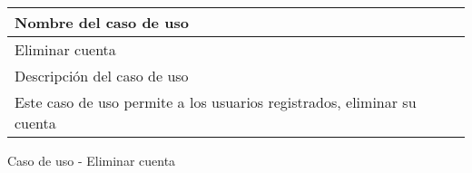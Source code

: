 \begin{identificacionCasoDeUso}
	\begin{tabular} { | p{17cm} |}

		\hline
		Nombre del caso de uso                                                  \\ \hline
		Eliminar cuenta                                                         \\ \hline
		Descripción del caso de uso                                             \\ \hline
		Este caso de uso permite a los usuarios registrados, eliminar su cuenta \\ \hline
	\end{tabular}
	\caption{Caso de uso - Eliminar cuenta}
\end{identificacionCasoDeUso}